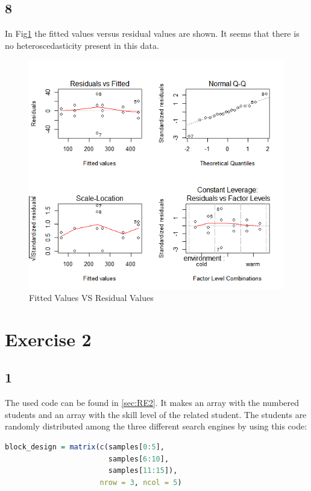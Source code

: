 \documentclass{article}
\begin{document}
    \subsection*{8}
      In Fig\ref{fig:FitVSRes} the fitted values versus residual values are shown.
      It seems that there is no heteroscedasticity present in this data.
      \begin{figure}[H]
          \centering
          \includegraphics[scale=0.4]{../results/FitVSRes.png} 
          \caption{Fitted Values VS Residual Values}
          \label{fig:FitVSRes}
      \end{figure}
    
    
  \section*{Exercise 2}
    \subsection*{1}
      The used code can be found in \ref{sec:RE2}.
      It makes an array with the numbered students and an array with the skill level of the related student.
      The students are randomly distributed among the three different search engines by using this code:
      \begin{lstlisting}[language=R]
block_design = matrix(c(samples[0:5], 
                        samples[6:10], 
                        samples[11:15]), 
                      nrow = 3, ncol = 5)
      \end{lstlisting}
     
\end{document}

